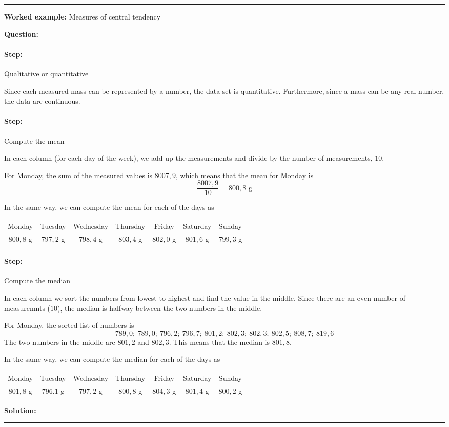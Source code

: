 \documentclass[a4paper,11pt]{report}
\newenvironment{wex}[3]%
{\rule{\linewidth}{0.5mm}
\textbf{Worked example:} #1

\textbf{Question:} #2

\textbf{Solution:} #3}%
{\rule{\linewidth}{0.5mm}}
\newcommand{\westep}[1]{\paragraph{Step:} #1}
\begin{document}
\begin{wex}{Measures of central tendency}
{  \westep{Qualitative or quantitative}

  Since each measured mass can be represented by a number, the data
  set is quantitative. Furthermore, since a mass can be any real
  number, the data are continuous.

  \westep{Compute the mean}

  In each column (for each day of the week), we add up the
  measurements and divide by the number of measurements, $10$.

  For Monday, the sum of the measured values is $8007,9$, which means
  that the mean for Monday is
  \begin{equation}
    \frac{8007,9}{10} = 800,8\textrm{ g}
  \end{equation}

  In the same way, we can compute the mean for each of the days as

  \begin{center}
    \begin{tabular}{ccccccc}
      \toprule
      Monday & Tuesday & Wednesday & Thursday & Friday & Saturday & Sunday \\
      $800,8$ g & $797,2$ g & $798,4$ g & $803,4$ g & $802,0$ g & $801,6$ g & $799,3$ g \\
      \bottomrule
    \end{tabular}
  \end{center}

  \westep{Compute the median}

  In each column we sort the numbers from lowest to highest and find
  the value in the middle. Since there are an even number of
  measuremnts ($10$), the median is halfway between the two numbers in
  the middle.

  For Monday, the sorted list of numbers is
  \begin{equation}
    789,0;\ 789,0;\ 796,2;\ 796,7;\ 801,2;\ 802,3;\ 802,3;\ 802,5;\ 808,7;\ 819,6
  \end{equation}
  The two numbers in the middle are $801,2$ and $802,3$. This means
  that the median is $801,8$.

  In the same way, we can compute the median for each of the days as

  \begin{center}
    \begin{tabular}{ccccccc}
      \toprule
      Monday & Tuesday & Wednesday & Thursday & Friday & Saturday & Sunday \\
      $801,8$ g & $796.1$ g & $797,2$ g & $800,8$ g & $804,3$ g & $801,4$ g & $800,2$ g \\
      \bottomrule
    \end{tabular}
  \end{center}

}
\end{wex}
\end{document}
